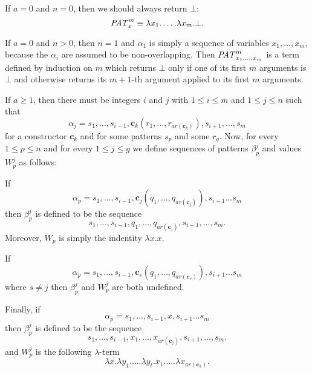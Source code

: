 \documentclass{LMCS}
\newcommand{\conone}{\mathbf{c}}
\newcommand{\patone}{s}
\newcommand{\pattwo}{r}
\newcommand{\patthree}{q}
\newcommand{\seqpone}{\alpha}
\newcommand{\seqptwo}{\beta}
\newcommand{\varone}{x}
\newcommand{\vartwo}{y}
\newcommand{\valuetwo}{W}
\newcommand{\errorterm}{\bot}
\newcommand{\arity}[1]{\mathit{ar}(#1)}
\newenvironment{varitemize}
{
\begin{list}{\labelitemi}
{\setlength{\itemsep}{0.0mm}
 \setlength{\topsep}{0.0mm}
 \setlength{\parindent}{0.0mm}
 \setlength{\parskip}{0.0mm}
 \setlength{\parsep}{0.0mm}
 \setlength{\partopsep}{0.0mm}
 \setlength{\leftmargin}{15pt}
 \setlength{\labelsep}{5pt}
 \setlength{\labelwidth}{10pt}}}
{
 \end{list} 
}
\newenvironment{varitemizeii}
{
\begin{list}{\labelitemiv}
{\setlength{\itemsep}{0.0mm}
 \setlength{\topsep}{0.0mm}
 \setlength{\parindent}{0.0mm}
 \setlength{\parskip}{0.0mm}
 \setlength{\parsep}{0.0mm}
 \setlength{\partopsep}{0.0mm}
 \setlength{\leftmargin}{15pt}
 \setlength{\labelsep}{5pt}
 \setlength{\labelwidth}{10pt}}}
{
 \end{list} 
}
\begin{document}
\begin{varitemize}
\item
  If $a=0$ and $n=0$, then we should always return $\errorterm$: 
  $$
  \patlambda_{\varepsilon}^m\equiv\lambda\varone_1.\ldots.\lambda\varone_m.\errorterm.
  $$
\item
  If $a=0$ and $n>0$, then $n=1$ and $\seqpone_1$ is simply a sequence of variables 
  $\varone_1,\ldots,\varone_m$, because the $\seqpone_i$ are assumed to be non-overlapping.
  Then $\patlambda_{\varone_1,\ldots,\varone_m}^m$ is a term defined by induction on $m$
  which returns $\errorterm$ only if one of its first $m$ arguments is $\errorterm$ and otherwise
  returns its $m+1$-th argument applied to its first $m$ arguments.
\item
  If $a\geq 1$, then there must be integers $i$ and $j$ with 
  $1\leq i\leq m$ and $1\leq j\leq n$ such that
  $$
  \seqpone_j=\patone_1,\ldots,\patone_{i-1},\conone_k(\pattwo_1,\ldots,\pattwo_{\arity{\conone_k}}),
  \patone_{i+1},\ldots,\patone_{m}
  $$
  for a constructor $\conone_k$ and for some patterns $\patone_p$ and some $\pattwo_q$.
  Now, for every $1\leq p\leq n$ 
  and for every $1\leq j\leq g$ 
  we define sequences of patterns $\seqptwo_p^j$ and values $\valuetwo_p^j$ as follows:
  \begin{varitemizeii}
  \item
    If 
    $$
    \seqpone_p=\patone_1,\ldots,\patone_{i-1},\conone_j(\patthree_1,\ldots,\patthree_{\arity{\conone_j}}),
    \patone_{i+1}\ldots\patone_m
    $$
    then $\seqptwo_p^j$ is defined to be the sequence
    $$
    \patone_1,\ldots,\patone_{i-1},\patthree_1,\ldots,\patthree_{\arity{\conone_j}},\patone_{i+1},\ldots,\patone_m.
    $$
    Moreover, $\valuetwo_p$ is simply the indentity $\lambda\varone.\varone$.
  \item
    If 
    $$
    \seqpone_p=\patone_1,\ldots,\patone_{i-1},\conone_s(\patthree_1,\ldots,\patthree_{\arity{\conone_s}}),
    \patone_{i+1}\ldots\patone_m
    $$
    where $s\neq j$ then $\seqptwo_p^j$ and $\valuetwo_p^j$ are both undefined.
  \item
    Finally, if
    $$
    \seqpone_p=\patone_1,\ldots,\patone_{i-1},\varone,\patone_{i+1}\ldots\patone_m
    $$
    then $\seqptwo_p^j$ is defined to be the sequence
    $$
    \patone_1,\ldots,\patone_{i-1},\varone_1,\ldots,\varone_{\arity{\conone_j}},\patone_{i+1},\ldots,\patone_m.
    $$
    and $\valuetwo_p^j$ is the following $\lambda$-term
    $$
    \lambda\varone.\lambda\vartwo_1.\ldots.\lambda\vartwo_t.\varone_1.\ldots.\lambda\varone_{\arity{\conone_k}}.
$$
\end{varitemizeii}
\end{varitemize}
\end{document}
